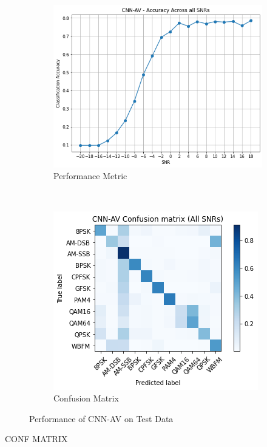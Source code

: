 \documentclass[journal,onecolumn]{IEEEtran}
\begin{document}
\begin{figure}[h]
    \centering
    \begin{subfigure}[b]{0.5\textwidth}
        \centering
        \includegraphics[scale=0.5]{cnnACCSNR}
        \caption{Performance Metric}
    \end{subfigure}%
    ~ 
    \begin{subfigure}[b]{0.5\textwidth}
        \centering
        \includegraphics[scale=0.7]{cnnoverallConfMat}
        \caption{Confusion Matrix}
    \end{subfigure}
    \caption{Performance of CNN-AV on Test Data}
\end{figure}

CONF MATRIX
\end{document}
